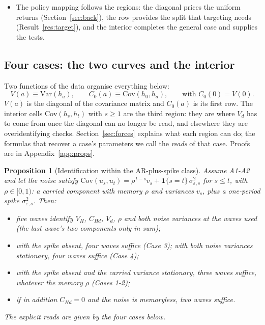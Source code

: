 \documentclass[11pt]{article}
\newtheorem{proposition}{Proposition}
\theoremstyle{remark}
\newcommand{\Var}{\mathrm{Var}}
\newcommand{\Cov}{\mathrm{Cov}}
\begin{document}
\begin{itemize}
\item The policy mapping follows the regions: the diagonal prices the uniform returns (Section~\ref{sec:back}), the row provides the split that targeting needs (Result~\ref{res:target}), and the interior completes the general case and supplies the tests.
\end{itemize}

\subsection{Four cases: the two curves and the interior}\label{sec:cases}

Two functions of the data organise everything below:
\begin{equation}
V(a)\equiv\Var(h_a),
\qquad
C_0(a)\equiv\Cov(h_0,h_a),
\qquad\text{with } C_0(0)=V(0).
\label{eq:curves}
\end{equation}
$V(a)$ is the diagonal of the covariance matrix and $C_0(a)$ is its first row.
The interior cells $\Cov(h_s,h_t)$ with $s\ge1$ are the third region: they are where $V_d$ has to come from once the diagonal can no longer be read, and elsewhere they are overidentifying checks.
Section~\ref{sec:forces} explains what each region can do; the formulas that recover a case's parameters we call the \emph{reads} of that case.
Proofs are in Appendix~\ref{app:props}.

\begin{proposition}[Identification within the AR-plus-spike class]\label{prop:main}
Assume A1-A2 and let the noise satisfy
$\Cov(u_s,u_t)=\rho^{\,t-s}v_s+\mathbf{1}\{s=t\}\,\sigma^2_{\varepsilon,s}$ for $s\le t$, with $\rho\in[0,1)$: a carried component with memory $\rho$ and variances $v_s$, plus a one-period spike $\sigma^2_{\varepsilon,s}$.
Then:
\begin{itemize}
\item[(i)] five waves identify $V_H$, $C_{Hd}$, $V_d$, $\rho$ and both noise variances at the waves used (the last wave's two components only in sum);
\item[(ii)] with the spike absent, four waves suffice (Case 3); with both noise variances stationary, four waves suffice (Case 4);
\item[(iii)] with the spike absent and the carried variance stationary, three waves suffice, whatever the memory $\rho$ (Cases 1-2);
\item[(iv)] if in addition $C_{Hd}=0$ and the noise is memoryless, two waves suffice.
\end{itemize}
The explicit reads are given by the four cases below.
\end{proposition}
\end{document}
